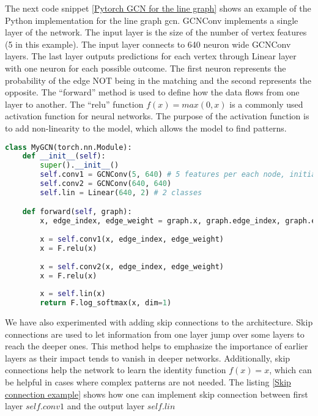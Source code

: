 The next code snippet \ref{Pytorch GCN for the line graph} shows an example of the Python implementation for the line graph \gls{gcn}. GCNConv implements a single layer of the network. The input layer is the size of the number of vertex features (5 in this example). The input layer connects to 640 neuron wide GCNConv layers. The last layer outputs predictions for each vertex through Linear layer with one neuron for each possible outcome. The first neuron represents the probability of the edge NOT being in the matching and the second represents the opposite. The “forward” method is used to define how the data flows from one layer to another. The “relu” function $f(x) = max(0,x)$ is a commonly used activation function for neural networks. The purpose of the activation function is to add non-linearity to the model, which allows the model to find patterns.

\begin{lstlisting}[caption={Pytorch GCN for the line graph}, label={Pytorch GCN for the line graph}, language=Python]
class MyGCN(torch.nn.Module):
    def __init__(self):
        super().__init__()
        self.conv1 = GCNConv(5, 640) # 5 features per each node, initialy 1
        self.conv2 = GCNConv(640, 640)
        self.lin = Linear(640, 2) # 2 classes 

    def forward(self, graph):        
        x, edge_index, edge_weight = graph.x, graph.edge_index, graph.edge_weight
        
        x = self.conv1(x, edge_index, edge_weight)
        x = F.relu(x)
        
        x = self.conv2(x, edge_index, edge_weight)
        x = F.relu(x)
        
        x = self.lin(x)
        return F.log_softmax(x, dim=1)    
\end{lstlisting}

We have also experimented with adding skip connections to the architecture. Skip connections are used to let information from one layer jump over some layers to reach the deeper ones. This method helps to emphasize the importance of earlier layers as their impact tends to vanish in deeper networks. Additionally, skip connections help the network to learn the identity function $f(x) = x$, which can be helpful in cases where complex patterns are not needed. The listing \ref{Skip connection example} shows how one can implement skip connection between first layer $self.conv1$ and the output layer $self.lin$

